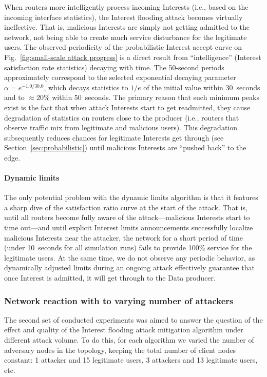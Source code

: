 When routers more intelligently process incoming Interests (i.e., based on the incoming interface statistics), the Interest flooding attack becomes virtually ineffective.
That is, malicious Interests are simply not getting admitted to the network, not being able to create much service disturbance for the legitimate users.
The observed periodicity of the probabilistic Interest accept curve on Fig.~\ref{fig:small-scale attack progress} is a direct result from ``intelligence'' (Interest satisfaction rate statistics) decaying with time.
The 50-second periods approximately correspond to the selected exponential decaying parameter $\alpha=e^{−1.0/30.0}$, which decays statistics to $1/e$ of the initial value within 30~seconds and to $\approx20\%$ within 50~seconds.
The primary reason that such minimum peaks exist is the fact that when attack Interests start to get readmitted, they cause degradation of statistics on routers close to the producer (i.e., routers that observe traffic mix from legitimate and malicious users).
This degradation subsequently reduces chances for legitimate Interests get through (see Section~\ref{sec:probabilistic}) until malicious Interests are ``pushed back'' to the edge.

\paragraph{\textbf{Dynamic limits}}

The only potential problem with the dynamic limits algorithm is that it features a sharp dive of the satisfaction ratio curve at the start of the attack.
That is, until all routers become fully aware of the attack---malicious Interests start to time out---and until explicit Interest limits announcements successfully localize malicious Interests near the attacker, the network for a short period of time (under 10~seconds for all simulation runs) fails to provide 100\% service for the legitimate users.
At the same time, we do not observe any periodic behavior, as dynamically adjusted limits during an ongoing attack effectively guarantee that once Interest is admitted, it will get through to the Data producer.

\subsubsection{Network reaction with to varying number of attackers}

The second set of conducted experiments was aimed to answer the question of the effect and quality of the Interest flooding attack mitigation algorithm under different attack volume.
To do this, for each algorithm we varied the number of adversary nodes in the topology, keeping the total number of client nodes constant: 1 attacker and 15 legitimate users, 3 attackers and 13 legitimate users, etc.

